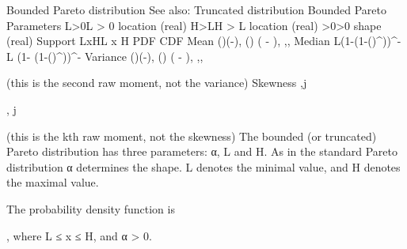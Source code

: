 


Bounded Pareto distribution
See also: Truncated distribution
Bounded Pareto
Parameters	
{\displaystyle L>0}L > 0 location (real)
{\displaystyle H>L}H > L location (real)
{\displaystyle \alpha >0}\alpha >0 shape (real)
Support	{\displaystyle L\leqslant x\leqslant H}L \leqslant x \leqslant H
PDF	{}
CDF	{}
Mean	
{\cdot \left({}\right)\cdot \left({}-{}\right),\alpha {}} \cdot \left(\right) \cdot \left( - \right), \alpha{} 
{,}{,}
Median	
{\displaystyle L\left(1-{}\left(1-\left({}\right)^{\alpha }\right)\right)^{-{}}} 
L \left(1- \left(1-\left(\right)^\alpha\right)\right)^{-}
Variance	
{\cdot \left({}\right)\cdot \left({}-{}\right),\alpha {}} \cdot \left(\right) \cdot \left( - \right), \alpha{} {,}{,}

(this is the second raw moment, not the variance)
Skewness	
{,\alpha \neq j}

 \cdot {}, \alpha \neq j 

(this is the kth raw moment, not the skewness)
The bounded (or truncated) Pareto distribution has three parameters: α, L and H. As in the standard Pareto distribution α determines the shape. L denotes the minimal value, and H denotes the maximal value.

The probability density function is

{},
where L ≤ x ≤ H, and α > 0.

